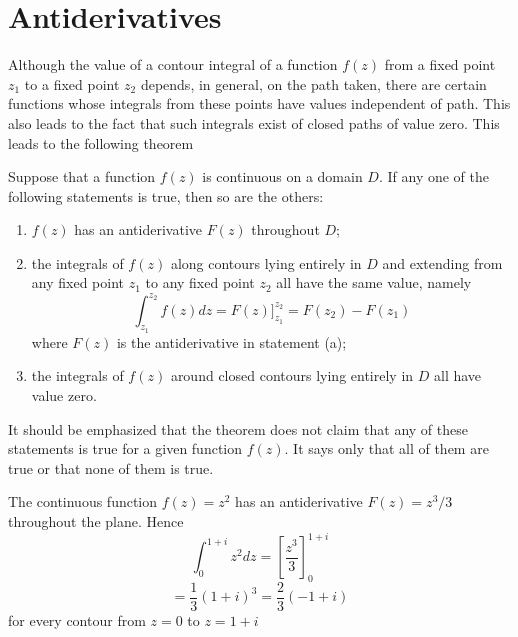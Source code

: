 \section{Antiderivatives}
Although the value of a contour integral of a function $ f(z) $ from a fixed point $ z_1 $ to a fixed point $ z_2 $ depends, in general, on the path taken, there are certain functions whose integrals from these points have values independent of path. This also leads to the fact that such integrals exist of closed paths of value zero. This leads to the following theorem
\begin{theorem}
	Suppose that a function $ f(z) $ is continuous on a domain $ D $. If any one of the following statements is true, then so are the others: 
	\begin{enumerate}
		\item$ f(z) $ has an antiderivative $ F(z) $ throughout $ D $; 
		\item the integrals of $ f(z) $ along contours lying entirely in $ D $ and extending from any fixed point $ z_1 $ to any fixed point $ z_2 $ all have the same value, namely 
		\[ \int_{z_1}^{z_2} f(z) dz = F(z)]_{z_1}^{z_2} = F(z_2) - F(z_1) \] where $ F(z) $ is the antiderivative in statement (a); 
		\item the integrals of $ f(z) $ around closed contours lying entirely in $ D $ all have value zero. 
	\end{enumerate}
\end{theorem}
It should be emphasized that the theorem does not claim that any of these
statements is true for a given function $ f(z) $. It says only that all of them are true or
that none of them is true. 
\begin{example}
	The continuous function $ f(z) = z^2$ has an antiderivative $ F(z) = z^3 / 3  $ throughout the plane. Hence 
	\[ \int_{0}^{1+i} z^2 dz =  \left[ \dfrac{z^3}{3} \right]_{0}^{1+i} \]
	\[ = \dfrac{1}{3} (1+i) ^3 = \dfrac{2}{3}(-1+i)\] for every contour from $ z = 0 $ to $ z = 1 + i $
\end{example}
